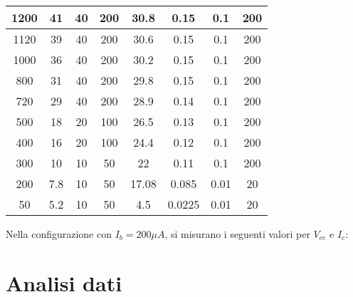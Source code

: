 \documentclass{article}
\begin{document}
\begin{table}[H]
\begin{tabular}{|c|c|c|c|c|c|c|c|}
        1200          & 41                        & 40                        & 200                       & 30.8       & 0.15                      & 0.1                       & 200                       \\ \hline
        1120          & 39                        & 40                        & 200                       & 30.6       & 0.15                      & 0.1                       & 200                       \\ \hline
        1000          & 36                        & 40                        & 200                       & 30.2       & 0.15                      & 0.1                       & 200                       \\ \hline
        800           & 31                        & 40                        & 200                       & 29.8       & 0.15                      & 0.1                       & 200                       \\ \hline
        720           & 29                        & 40                        & 200                       & 28.9       & 0.14                      & 0.1                       & 200                       \\ \hline
        500           & 18                        & 20                        & 100                       & 26.5       & 0.13                      & 0.1                       & 200                       \\ \hline
        400           & 16                        & 20                        & 100                       & 24.4       & 0.12                      & 0.1                       & 200                       \\ \hline
        300           & 10                        & 10                        & 50                        & 22         & 0.11                      & 0.1                       & 200                       \\ \hline
        200           & 7.8                       & 10                        & 50                        & 17.08      & 0.085                     & 0.01                      & 20                        \\ \hline
        50            & 5.2                       & 10                        & 50                        & 4.5        & 0.0225                    & 0.01                      & 20                        \\ \hline
    \end{tabular}
\end{table}

Nella configurazione con $I_b=200\mu A$, si misurano i seguenti valori per $V_{ce}$ e $I_c$:


\section{Analisi dati}
\end{document}
